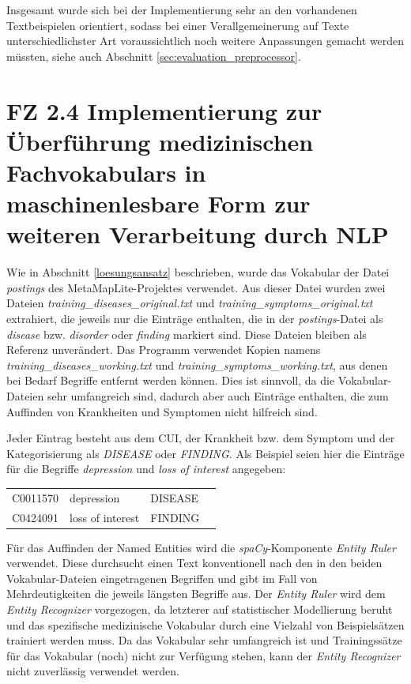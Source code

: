 Insgesamt wurde sich bei der Implementierung sehr an den vorhandenen Textbeispielen orientiert, sodass bei einer Verallgemeinerung auf Texte unterschiedlichster Art voraussichtlich noch weitere Anpassungen gemacht werden müssten, siehe auch Abschnitt \ref{sec:evaluation_preprocessor}. 
\vspace*{5mm}
\section[FZ 2.4 Implementierung zur Überf. med. Fachvokabulars]{FZ 2.4 Implementierung zur Überführung medizinischen Fachvokabulars in maschinenlesbare Form zur weiteren Verarbeitung durch NLP}
\label{sec:FZ2.4}

Wie in Abschnitt \ref{loesungsansatz} beschrieben, wurde das Vokabular der Datei \emph{postings} des MetaMapLite-Projektes verwendet. Aus dieser Datei wurden zwei Dateien \emph{training\_diseases\_original.txt} und \emph{training\_symptoms\_original.txt} extrahiert, die jeweils nur die Einträge enthalten, die in der \emph{postings}-Datei als \emph{disease} bzw. \emph{disorder} oder \emph{finding} markiert sind. Diese Dateien bleiben als Referenz unverändert. Das Programm verwendet Kopien namens \\
\emph{training\_diseases\_working.txt} und \emph{training\_symptoms\_working.txt}, aus denen bei Bedarf Begriffe entfernt werden können. Dies ist sinnvoll, da die Vokabular-Dateien sehr umfangreich sind, dadurch aber auch Einträge enthalten, die zum Auffinden von Krankheiten und Symptomen nicht hilfreich sind.

Jeder Eintrag besteht aus dem CUI, der Krankheit bzw. dem Symptom und der Kategorisierung als \emph{DISEASE} oder \emph{FINDING}. Als Beispiel seien hier die Einträge für die Begriffe \emph{depression} und \emph{loss of interest} angegeben:

\begin{center}
\begin{tabular}{llll}
C0011570 & depression & DISEASE \\
C0424091 & loss of interest & FINDING \\
\end{tabular}
\end{center}

Für das Auffinden der Named Entities wird die \emph{spaCy}-Komponente \emph{Entity Ruler} verwendet. Diese durchsucht einen Text konventionell nach den in den beiden Vokabular-Dateien eingetragenen Begriffen und gibt im Fall von Mehrdeutigkeiten die jeweils längsten Begriffe aus. Der \emph{Entity Ruler} wird dem \emph{Entity Recognizer} vorgezogen, da letzterer auf statistischer Modellierung beruht und das spezifische medizinische Vokabular durch eine Vielzahl von Beispielsätzen trainiert werden muss. Da das Vokabular sehr umfangreich ist und Trainingssätze für das Vokabular (noch) nicht zur Verfügung stehen, kann der \emph{Entity Recognizer} nicht zuverlässig verwendet werden.

